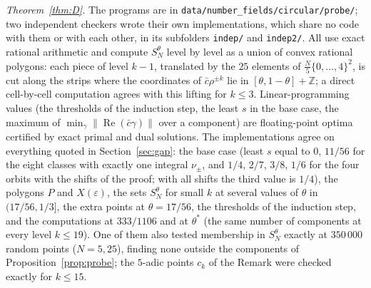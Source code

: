 \documentclass[11pt,a4paper]{amsart}
\theoremstyle{remark}
\newcommand{\Z}{\mathbb{Z}}
\begin{document}
\emph{Theorem~\ref{thm:D}.} The programs are in \nolinkurl{data/number_fields/circular/probe/}; two independent
checkers wrote their own implementations, which share no code with them or with each other, in its subfolders \nolinkurl{indep/} and
\nolinkurl{indep2/}. All use exact rational arithmetic and compute $S_N^\theta$ level by level as a union of convex
rational polygons: each piece of level $k-1$, translated by the $25$ elements of $\frac N5\{0,\dots,4\}^2$, is cut
along the strips where the coordinates of $\bar c\rho^{\pm k}$ lie in $[\theta,1-\theta]+\Z$; a direct cell-by-cell
computation agrees with this lifting for $k\le3$. Linear-programming values (the thresholds of the induction step,
the least $s$ in the base case, the maximum of $\min_\gamma\|\operatorname{Re}(\bar c\gamma)\|$ over a component) are
floating-point optima certified by exact primal and dual solutions. The implementations agree on everything quoted in
Section~\ref{sec:gap}: the base case (least $s$ equal to $0$, $11/56$ for the eight classes with exactly one integral
$\nu_\pm$, and $1/4$, $2/7$, $3/8$, $1/6$ for the four orbits with the shifts of the proof; with all shifts the third
value is $1/4$), the polygons $P$ and $X(\varepsilon)$, the sets $S_N^\theta$ for small $k$ at several values of
$\theta$ in $(17/56,1/3]$, the extra points at $\theta=17/56$, the thresholds of the induction step, and the
computations at $333/1106$ and at $\theta^*$ (the same number of components at every level $k\le19$). One of them also
tested membership in $S_N^\theta$ exactly at $350\,000$ random points ($N=5,25$), finding none outside the components
of Proposition~\ref{prop:probe}; the $5$-adic points $c_k$ of the Remark were checked exactly for $k\le15$.
\end{document}
